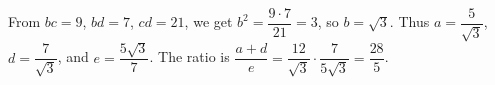 From $bc=9$, $bd=7$, $cd=21$, we get $b^2=\dfrac{9\cdot7}{21}=3$, so $b=\sqrt3$. Thus $a=\dfrac{5}{\sqrt3}$, $d=\dfrac{7}{\sqrt3}$, and $e=\dfrac{5\sqrt3}{7}$. The ratio is $\dfrac{a+d}{e}=\dfrac{12}{\sqrt3}\cdot\dfrac{7}{5\sqrt3}=\boxed{\dfrac{28}{5}}$.
